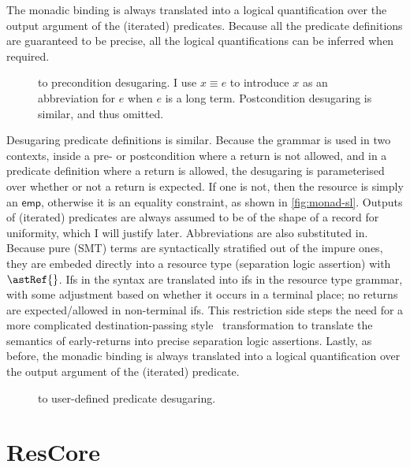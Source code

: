 The monadic binding  is always translated into a logical %
quantification over the output argument of the (iterated) predicates. Because
all the predicate definitions are guaranteed to be precise, all the logical
quantifications can be inferred when required.

\begin{figure}[tp]
    \small
    \raggedright{}
    \cndefnSpecXXNormArg{}
    \caption{ to  precondition desugaring. I use $x \equiv e$
        to introduce $x$ as an abbreviation for $e$ when $e$ is a long term.
        Postcondition desugaring is similar, and thus omitted.}\label{fig:precond-to-kernel}
\end{figure}

Desugaring predicate definitions is similar. Because the grammar is used in two
contexts, inside a pre- or postcondition where a return is not allowed, and in
a predicate definition where a return is allowed, the desugaring is
parameterised over whether or not a return is expected. If one is not, then the
resource is simply an $\mathsf{emp}$, otherwise it is an equality constraint,
as shown in \cref{fig:monad-sl}. Outputs of (iterated) predicates are always
assumed to be of the shape of a record for uniformity, which I will justify
later. Abbreviations are also substituted in.
Because pure (SMT) terms are syntactically stratified out of
the impure ones, they are embeded directly into a resource type (separation
logic assertion) with $\astRef{}$. Ifs in the syntax are translated into ifs in
the resource type grammar, with some adjustment based on whether it occurs in a
terminal place; no returns are expected/allowed in non-terminal
ifs. This restriction side steps the need for a more complicated
destination-passing style~ transformation to
translate the semantics of early-returns into precise separation logic
assertions. Lastly, as before, the monadic binding  is %
always translated into a logical quantification over the output argument of the
(iterated) predicate.

\begin{figure}[tp]
    \small
    \raggedright{}
    \cndefnSpecXXRes{}
    \caption{ to  user-defined predicate desugaring.}\label{fig:pred-to-kernel}
\end{figure}

\section{ResCore}\label{sec:rescore}

